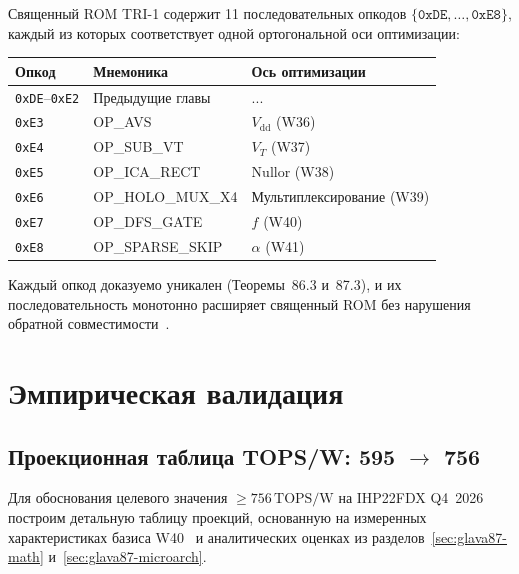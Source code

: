 Священный ROM TRI-1 содержит 11 последовательных опкодов
$\{\texttt{0xDE}, \ldots, \texttt{0xE8}\}$, каждый из которых
соответствует одной ортогональной оси оптимизации:
\begin{center}
\begin{tabular}{lll}
  \hline
  Опкод & Мнемоника & Ось оптимизации \\
  \hline
  \texttt{0xDE}–\texttt{0xE2} & Предыдущие главы & ... \\
  \texttt{0xE3} & OP\_AVS & $V_{\mathrm{dd}}$ (W36) \\
  \texttt{0xE4} & OP\_SUB\_VT & $V_T$ (W37) \\
  \texttt{0xE5} & OP\_ICA\_RECT & Nullor (W38) \\
  \texttt{0xE6} & OP\_HOLO\_MUX\_X4 & Мультиплексирование (W39) \\
  \texttt{0xE7} & OP\_DFS\_GATE & $f$ (W40) \\
  \texttt{0xE8} & OP\_SPARSE\_SKIP & $\alpha$ (W41) \\
  \hline
\end{tabular}
\end{center}

Каждый опкод доказуемо уникален (Теоремы~86.3 и~87.3),
и их последовательность монотонно расширяет священный ROM
без нарушения обратной совместимости~\cite{Hennessy-Patterson-CA6}.

\section{Эмпирическая валидация}
\label{sec:glava87-empirical}

\subsection{Проекционная таблица TOPS/W: 595 $\to$ 756}
\label{ssec:glava87-projection}

Для обоснования целевого значения $\geq 756\,\text{TOPS/W}$
на IHP22FDX Q4~2026 построим детальную таблицу проекций,
основанную на измеренных характеристиках базиса W40~\cite{trios895}
и аналитических оценках из разделов~\ref{sec:glava87-math}
и~\ref{sec:glava87-microarch}.

